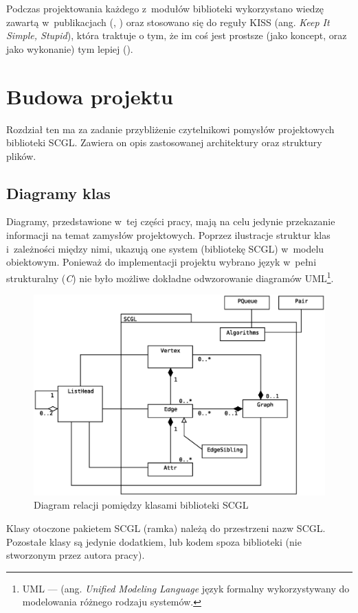 \documentclass[a4paper,12pt,polish,twoside,openright]{thesis}
\begin{document}
Podczas projektowania każdego z~modułów biblioteki wykorzystano wiedzę zawartą w~publikacjach (\cite{unix}, \cite{ansi}) oraz stosowano się do reguły KISS (ang. \emph{Keep It Simple, Stupid}), która traktuje o tym, że im coś jest prostsze (jako koncept, oraz jako wykonanie) tym lepiej (\cite{unix}).
\label{kiss}

\section{Budowa projektu}
Rozdział ten ma za zadanie przybliżenie czytelnikowi pomysłów projektowych biblioteki SCGL.
Zawiera on opis zastosowanej architektury oraz struktury plików.
\subsection{Diagramy klas}
Diagramy, przedstawione w~tej części pracy, mają na celu jedynie przekazanie informacji na temat zamysłów projektowych.
Poprzez ilustracje struktur klas i~zależności między nimi, ukazują one system (bibliotekę SCGL) w~modelu obiektowym.
Ponieważ do implementacji projektu wybrano język w~pełni strukturalny (\emph{C}) nie było możliwe dokładne odwzorowanie diagramów UML\footnote{UML --- (ang. \emph{Unified Modeling Language} język formalny wykorzystywany do modelowania różnego rodzaju systemów.}.

\begin{figure}[htb]
	\begin{center}
		\includegraphics[width=1.00\textwidth]{gfx/class_01.eps}
		\caption{Diagram relacji pomiędzy klasami biblioteki SCGL}
	\end{center}
\end{figure}
Klasy otoczone pakietem SCGL (ramka) należą do przestrzeni nazw SCGL.
Pozostałe klasy są jedynie dodatkiem, lub kodem spoza biblioteki (nie stworzonym przez autora pracy).
\end{document}
